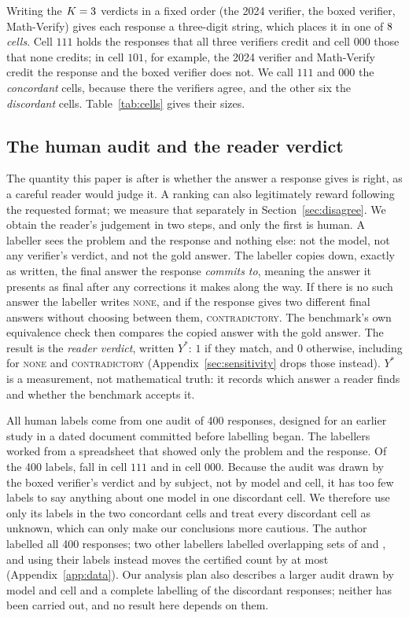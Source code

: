 Writing the $K = 3$ verdicts in a fixed order (the 2024 verifier, the boxed verifier,
Math-Verify) gives each response a three-digit string, which places it in one of $8$
\emph{cells}.
Cell $111$ holds the responses that all three verifiers credit and cell $000$ those that none
credits; in cell $101$, for example, the 2024 verifier and Math-Verify credit the response and the
boxed verifier does not. We call $111$ and $000$ the \emph{concordant} cells, because there the
verifiers agree, and the other six the \emph{discordant} cells. Table~\ref{tab:cells} gives their
sizes.

\subsection{The human audit and the reader verdict}

The quantity this paper is after is whether the answer a response gives is right, as a careful
reader would judge it. A ranking can also legitimately reward following the requested format; we
measure that separately in Section~\ref{sec:disagree}. We obtain the reader's judgement in two
steps, and only the first is human. A labeller sees the problem and the response and nothing
else: not the model, not any verifier's verdict, and not the gold answer. The labeller copies down,
exactly as written, the final answer the response \emph{commits to}, meaning the answer it presents
as final after any corrections it makes along the way. If there is no such answer the labeller
writes \textsc{none}, and if the response gives two different final answers without choosing
between them, \textsc{contradictory}. The benchmark's own equivalence check then compares the copied
answer with the gold answer. The result is the \emph{reader verdict}, written $Y^*$: $1$ if they
match, and $0$ otherwise, including for \textsc{none} and \textsc{contradictory} (Appendix~\ref{sec:sensitivity}
drops those instead). $Y^*$ is a measurement, not mathematical truth: it records which answer a
reader finds and whether the benchmark accepts it.

All human labels come from one audit of 400 responses, designed for an earlier study in a dated
document committed before labelling began. The labellers worked from a spreadsheet that showed only
the problem and the response. Of the 400 labels, \AuditNAgreeAll{} fall in cell $111$ and
\AuditNRejectAll{} in cell $000$. Because the audit was drawn by the boxed verifier's verdict and by
subject, not by model and cell, it has too few labels to say anything about one model in one
discordant cell. We therefore use only its labels in the two concordant cells and treat every
discordant cell as unknown, which can only make our conclusions more cautious. The author labelled
all 400 responses; two other labellers labelled overlapping sets of \LabTwoN{} and \LabThreeN{},
and using their labels instead moves the certified count by at most \LabSwapMax{}
(Appendix~\ref{app:data}). Our analysis plan also describes a larger audit drawn by model and cell
and a complete labelling of the discordant responses; neither has been carried out, and no result
here depends on them.
